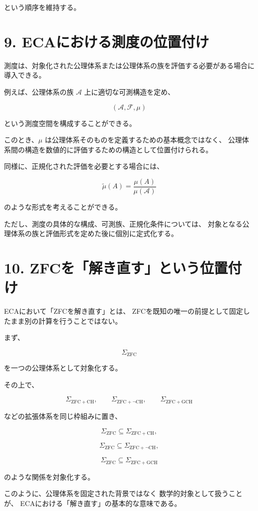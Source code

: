 \documentclass[11pt]{article}
\begin{document}
という順序を維持する。

\section{9. ECAにおける測度の位置付け}

測度は、対象化された公理体系または公理体系の族を評価する必要がある場合に導入できる。

例えば、公理体系の族 $\mathscr{A}$ 上に適切な可測構造を定め、

\[
(\mathscr{A},\mathcal{F},\mu)
\]

という測度空間を構成することができる。

このとき、$\mu$ は公理体系そのものを定義するための基本概念ではなく、
公理体系間の構造を数値的に評価するための構造として位置付けられる。

同様に、正規化された評価を必要とする場合には、

\[
\widetilde{\mu}(A)
=
\frac{\mu(A)}{\mu(\mathscr{A})}
\]

のような形式を考えることができる。

ただし、測度の具体的な構成、可測族、正規化条件については、
対象となる公理体系の族と評価形式を定めた後に個別に定式化する。

\section{10. ZFCを「解き直す」という位置付け}

ECAにおいて「ZFCを解き直す」とは、
ZFCを既知の唯一の前提として固定したまま別の計算を行うことではない。

まず、

\[
\Sigma_{\mathrm{ZFC}}
\]

を一つの公理体系として対象化する。

その上で、

\[
\Sigma_{\mathrm{ZFC+CH}},
\qquad
\Sigma_{\mathrm{ZFC+\neg CH}},
\qquad
\Sigma_{\mathrm{ZFC+GCH}}
\]

などの拡張体系を同じ枠組みに置き、

\[
\Sigma_{\mathrm{ZFC}}
\subseteq
\Sigma_{\mathrm{ZFC+CH}},
\]

\[
\Sigma_{\mathrm{ZFC}}
\subseteq
\Sigma_{\mathrm{ZFC+\neg CH}},
\]

\[
\Sigma_{\mathrm{ZFC}}
\subseteq
\Sigma_{\mathrm{ZFC+GCH}}
\]

のような関係を対象化する。

このように、公理体系を固定された背景ではなく
数学的対象として扱うことが、
ECAにおける「解き直す」の基本的な意味である。
\end{document}
